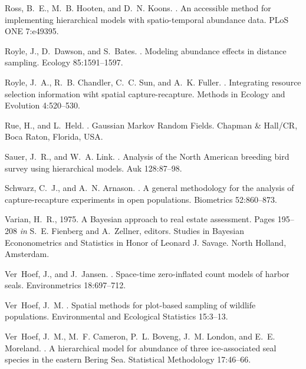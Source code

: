 \documentclass[12pt,english]{article}
\begin{document}
\begin{spacing}{1.9}
\begin{thebibliography}{59}
Ross, B.~E., M.~B. Hooten, and D.~N. Koons.
.
\newblock An accessible method for implementing hierarchical models with
  spatio-temporal abundance data.
\newblock PLoS ONE { 7}:e49395.

Royle, J., D.~Dawson, and S.~Bates.
.
\newblock Modeling abundance effects in distance sampling.
\newblock Ecology { 85}:1591--1597.

Royle, J.~A., R.~B. Chandler, C.~C. Sun, and A.~K. Fuller.
.
\newblock Integrating resource selection information wiht spatial
  capture-recapture.
\newblock Methods in Ecology and Evolution { 4}:520--530.

Rue, H., and L.~Held.
.
\newblock Gaussian Markov Random Fields.
\newblock Chapman \& Hall/CR, Boca Raton, Florida, USA.

Sauer, J.~R., and W.~A. Link.
.
\newblock Analysis of the {N}orth {A}merican breeding bird survey using
  hierarchical models.
\newblock Auk { 128}:87--98.

Schwarz, C.~J., and A.~N. Arnason.
.
\newblock A general methodology for the analysis of capture-recapture
  experiments in open populations.
\newblock Biometrics { 52}:860--873.

Varian, H.~R., 1975.
\newblock A {B}ayesian approach to real estate assessment.
\newblock Pages 195--208 {\em in\/} S.~E. Fienberg and A.~Zellner, editors.
  Studies in {B}ayesian Econonometrics and Statistics in Honor of {L}eonard
  {J}. {S}avage. North Holland, Amsterdam.

Ver~Hoef, J., and J.~Jansen.
.
\newblock Space-time zero-inflated count models of harbor seals.
\newblock Environmetrics { 18}:697--712.

Ver~Hoef, J.~M.
.
\newblock Spatial methods for plot-based sampling of wildlife populations.
\newblock Environmental and Ecological Statistics { 15}:3--13.

Ver~Hoef, J.~M., M.~F. Cameron, P.~L. Boveng, J.~M. London, and E.~E. Moreland.
.
\newblock A hierarchical model for abundance of three ice-associated seal
  species in the eastern {B}ering {S}ea.
\newblock Statistical Methodology { 17}:46--66.


\end{thebibliography}
\end{spacing}
\end{document}
